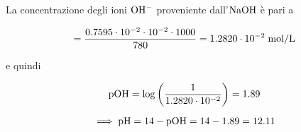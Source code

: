 \begin{soluzione}
La concentrazione degli ioni $\rm OH^-$ proveniente dall'$\rm NaOH$ è pari a

\begin{equation*}
    [\rm OH^-]=\frac{0.7595 \cdot 10^{-2} \cdot 10^{-2} \cdot 1000}{780}=1.2820 \cdot 10^{-2} \; \rm mol/L
\end{equation*}

e quindi

\begin{equation*}
    \rm pOH=\log{\left(\frac{1}{1.2820 \cdot 10^{-2}}\right)}=1.89
\end{equation*}

\begin{equation*}
    \implies \rm pH=14-pOH=14-1.89=12.11
\end{equation*}
\end{soluzione}

\newpage

